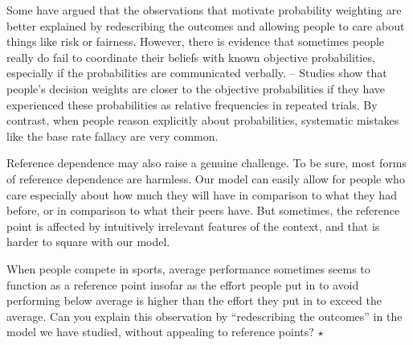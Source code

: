 Some have argued that the observations that motivate probability
weighting are better explained by redescribing the outcomes and
allowing people to care about things like risk or fairness. However,
there is evidence that sometimes people really do fail to coordinate
their beliefs with known objective probabilities, especially if the
probabilities are communicated verbally. -- Studies show that people's
decision weights are closer to the objective probabilities if they
have experienced these probabilities as relative frequencies in
repeated trials.%
By contrast, when people reason explicitly about probabilities,
systematic mistakes like the base rate fallacy are very common. 




Reference dependence may also raise a genuine challenge. To be sure,
most forms of reference dependence are harmless. Our model can easily
allow for people who care especially about how much they will have in
comparison to what they had before, or in comparison to what their
peers have. But sometimes, the reference point is affected by
intuitively irrelevant features of the context, and that is harder to
square with our model.

\begin{exercise}
  When people compete in sports, average performance sometimes seems
  to function as a reference point insofar as the effort people put in
  to avoid performing below average is higher than the effort they put
  in to exceed the average.%
  Can you explain this observation by ``redescribing the outcomes'' in
  the model we have studied, without appealing to reference points?
  $\star$
\end{exercise}

